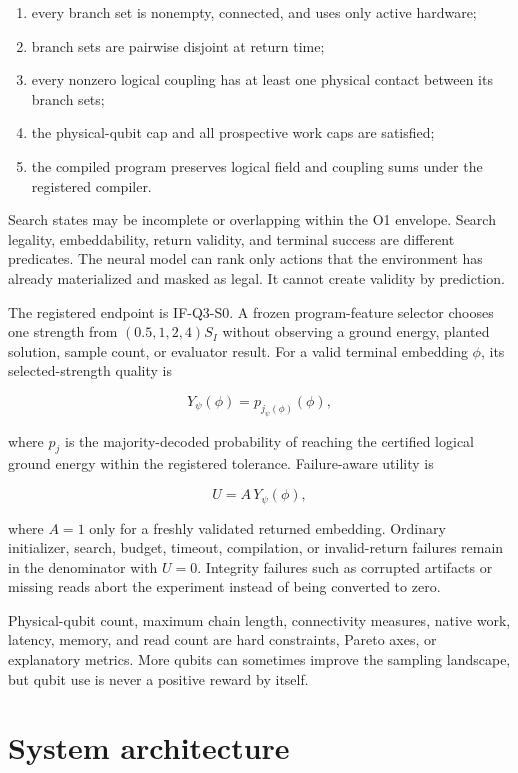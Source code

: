 \documentclass[
  american,
  10pt,
  a4paper,
]{article}
\providecommand{\tightlist}{%
  \setlength{\itemsep}{0pt}\setlength{\parskip}{0pt}}
\begin{document}
\begin{enumerate}
\def\labelenumi{\arabic{enumi}.}
\tightlist
\item
  every branch set is nonempty, connected, and uses only active
  hardware;
\item
  branch sets are pairwise disjoint at return time;
\item
  every nonzero logical coupling has at least one physical contact
  between its branch sets;
\item
  the physical-qubit cap and all prospective work caps are satisfied;
\item
  the compiled program preserves logical field and coupling sums under
  the registered compiler.
\end{enumerate}

Search states may be incomplete or overlapping within the O1 envelope.
Search legality, embeddability, return validity, and terminal success
are different predicates. The neural model can rank only actions that
the environment has already materialized and masked as legal. It cannot
create validity by prediction.

The registered endpoint is IF-Q3-S0. A frozen program-feature selector
chooses one strength from \((0.5,1,2,4)S_I\) without observing a ground
energy, planted solution, sample count, or evaluator result. For a valid
terminal embedding \(\phi\), its selected-strength quality is

\[
Y_\psi(\phi)=p_{j_\psi(\phi)}(\phi),
\]

where \(p_j\) is the majority-decoded probability of reaching the
certified logical ground energy within the registered tolerance.
Failure-aware utility is

\[
U=A\,Y_\psi(\phi),
\]

where \(A=1\) only for a freshly validated returned embedding. Ordinary
initializer, search, budget, timeout, compilation, or invalid-return
failures remain in the denominator with \(U=0\). Integrity failures such
as corrupted artifacts or missing reads abort the experiment instead of
being converted to zero.

Physical-qubit count, maximum chain length, connectivity measures,
native work, latency, memory, and read count are hard constraints,
Pareto axes, or explanatory metrics. More qubits can sometimes improve
the sampling landscape, but qubit use is never a positive reward by
itself.

\section{System architecture}\label{system-architecture}
\end{document}
